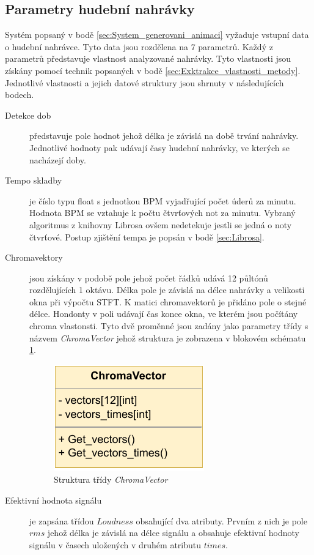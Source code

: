 \subsection{Parametry hudební nahrávky} \label{sec:Parametry_nahravky}

Systém popsaný v bodě \ref{sec:System_generovani_animaci} vyžaduje vstupní data o hudební nahrávce. Tyto data jsou rozdělena na 7 parametrů. Každý z parametrů představuje vlastnost analyzované nahrávky. Tyto vlastnosti jsou získány pomocí technik popsaných v bodě \ref{sec:Exktrakce_vlastnosti_metody}. Jednotlivé vlastnosti a jejich datové struktury jsou shrnuty v následujících bodech.

\begin{description}
    \item[Detekce dob] představuje pole hodnot jehož délka je závislá na době trvání nahrávky. Jednotlivé hodnoty pak udávají časy hudební nahrávky, ve kterých se nacházejí doby.
    \item[Tempo skladby] je číslo typu float s jednotkou \acs{BPM} vyjadřující počet úderů za minutu. Hodnota BPM se vztahuje k počtu čtvrťových not za minutu. Vybraný algoritmus z knihovny Librosa ovšem nedetekuje jestli se jedná o noty čtvrťové. Postup zjištění tempa je popsán v bodě \ref{sec:Librosa}.
    \item[Chromavektory] jsou získány v podobě pole jehož počet řádků udává 12 půltónů rozdělujících 1 oktávu. Délka pole je závislá na délce nahrávky a velikosti okna  při výpočtu \acs{STFT}. K matici chromavektorů je přidáno pole o stejné délce. Hondonty v poli udávají čas konce okna, ve kterém jsou počítány chroma vlastonsti. Tyto dvě proměnné jsou zadány jako parametry třídy s názvem \textit{ChromaVector} jehož struktura je zobrazena v blokovém schématu \ref{fig:ChromaVector_class_diagram}.

    \begin{figure}[H]
        \centering
        \includegraphics[width = 0.3\linewidth]{obrazky/UML_diagram_ChromaVector.pdf}
        \caption{Struktura třídy \textit{ChromaVector}}
        \label{fig:ChromaVector_class_diagram}
    \end{figure}

    \item[Efektivní hodnota signálu] je zapsána třídou $Loudness$ obsahující dva atributy. Prvním z nich je pole $rms$ jehož délka je závislá na délce signálu a obsahuje efektivní hodnoty signálu v časech uložených v druhém atributu $times$.
    

\end{description}
